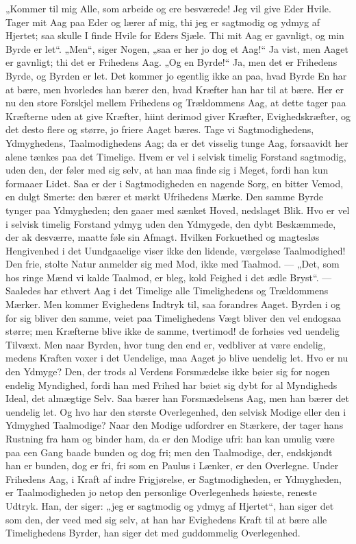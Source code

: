 \documentclass[12pt]{book}
\begin{document}
„Kommer til mig Alle, som arbeide og ere besværede! Jeg vil give
Eder Hvile. Tager mit Aag paa Eder og lærer af mig, thi jeg er
sagtmodig og ydmyg af Hjertet; saa skulle I finde Hvile for Eders
Sjæle. Thi mit Aag er gavnligt, og min Byrde er let“. „Men“, siger
Nogen, „saa er her jo dog et Aag!“ Ja vist, men Aaget er gavnligt;
thi det er Frihedens Aag. „Og en Byrde!“ Ja, men det er Frihedens
Byrde, og Byrden er let. Det
kommer jo egentlig ikke an paa, hvad Byrde En har at bære, men
hvorledes han bærer den, hvad Kræfter han har til at bære. Her er nu
den store Forskjel mellem Frihedens og Trældommens Aag, at dette
tager paa Kræfterne uden at give Kræfter, hiint derimod giver
Kræfter, Evighedskræfter, og det desto flere og større, jo friere
Aaget bæres. Tage vi Sagtmodighedens, Ydmyghedens, Taalmodighedens
Aag; da er det visselig tunge Aag, forsaavidt her alene tænkes paa
det Timelige. Hvem er vel i selvisk timelig Forstand sagtmodig, uden
den, der føler med sig selv, at han maa finde sig i Meget, fordi han
kun formaaer Lidet. Saa er der i Sagtmodigheden en nagende Sorg, en
bitter Vemod, en dulgt Smerte: den bærer et mørkt Ufrihedens Mærke.
Den samme Byrde tynger paa Ydmygheden; den gaaer med sænket Hoved,
nedslaget Blik. Hvo er vel i selvisk timelig Forstand ydmyg uden den
Ydmygede, den dybt Beskæmmede, der ak desværre, maatte føle sin
Afmagt. Hvilken Forkuethed og magtesløs Hengivenhed i det
Uundgaaelige viser ikke den lidende, værgeløse Taalmodighed! Den
frie, stolte Natur anmelder sig med Mod, ikke med Taalmod. --- „Det,
som hos ringe Mænd vi kalde Taalmod, er bleg, kold Feighed i det
ædle Bryst“. --- Saaledes har ethvert Aag i det Timelige alle
Timelighedens og Trældommens Mærker. Men kommer Evighedens Indtryk
til, saa forandres Aaget. Byrden i og for sig bliver den samme,
veiet paa Timelighedens Vægt bliver den vel endogsaa større; men
Kræfterne blive ikke de samme, tvertimod! de forhøies ved uendelig
Tilvæxt. Men naar Byrden, hvor tung den end er, vedbliver at være
endelig, medens Kraften voxer i det Uendelige, maa Aaget jo blive
uendelig let. Hvo er nu den Ydmyge? Den, der trods al Verdens
Forsmædelse ikke bøier sig for nogen endelig Myndighed, fordi han
med Frihed har bøiet sig dybt for al Myndigheds Ideal, det almægtige
Selv. Saa bærer han Forsmædelsens Aag, men
han bærer det uendelig let. Og hvo har den største Overlegenhed, den
selvisk Modige eller den i Ydmyghed Taalmodige? Naar den Modige
udfordrer en Stærkere, der tager hans Rustning fra ham og binder
ham, da er den Modige ufri: han kan umulig være paa een Gang baade
bunden og dog fri; men den Taalmodige, der, endskjøndt han er
bunden, dog er fri, fri som en Paulus i Lænker, er den Overlegne.
Under Frihedens Aag, i Kraft af indre Frigjørelse, er
Sagtmodigheden, er Ydmygheden, er Taalmodigheden jo netop den
personlige Overlegenheds høieste, reneste Udtryk. Han, der siger:
„jeg er sagtmodig og ydmyg af Hjertet“, han siger det som den, der
veed med sig selv, at han har Evighedens Kraft til at bære alle
Timelighedens Byrder, han siger det med guddommelig Overlegenhed.
\end{document}
